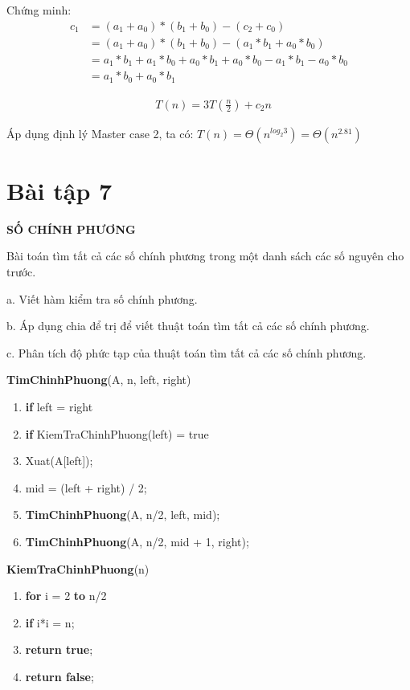 \documentclass[12pt, a4paper, fleqn]{article}
\begin{document}
	Chứng minh:
	\begin{align*}
	c_1 &= (a_1 + a_0) * (b_1 + b_0) - (c_2 + c_0)\\
	&= (a_1 + a_0) * (b_1 + b_0) - (a_1 * b_1 + a_0 * b_0)\\
	&= a_1 * b_1 + a_1 * b_0 + a_0 * b_1 + a_0 * b_0 - a_1 * b_1 - a_0 * b_0\\
	&= a_1 * b_0 + a_0 * b_1
	\end{align*}  
	
	\begin{align*}
	&T(n) = 3T\left(\frac{n}{2}\right) + c_2 n
	\end{align*}
	
	Áp dụng định lý Master case 2, ta có: $T(n) = \Theta (n^{log_{2} {3}}) = \Theta (n^{2.81})$
	
	\clearpage

	\section*{Bài tập 7}
	
	
	\textbf{SỐ CHÍNH PHƯƠNG}
	
	Bài toán tìm tất cả các số chính phương trong một danh sách các số nguyên cho trước.
	
	a. Viết hàm kiểm tra số chính phương.
	
	b. Áp dụng chia để trị để viết thuật toán tìm tất cả các số chính phương.
	
	c. Phân tích độ phức tạp của thuật toán tìm tất cả các số chính phương.
	
	{  \selectfont
		\textbf{TimChinhPhuong}(A, n, left, right)
		\begin{enumerate}
			\item \textbf{if} left = right
			\item \qquad \textbf{if} KiemTraChinhPhuong(left) = true
			\item \qquad Xuat(A[left]);
			\item mid = (left + right) / 2;
			\item \textbf{TimChinhPhuong}(A, n/2, left, mid);
			\item \textbf{TimChinhPhuong}(A, n/2, mid + 1, right);
		\end{enumerate}
		
		\textbf{KiemTraChinhPhuong}(n)
		\begin{enumerate}
			\item \textbf{for} i = 2 \textbf{to} n/2
			\item \qquad \textbf{if} i*i = n;
			\item \qquad \qquad \textbf{return true};
			\item \textbf{return false};
		\end{enumerate}
	}
	
\end{document}
